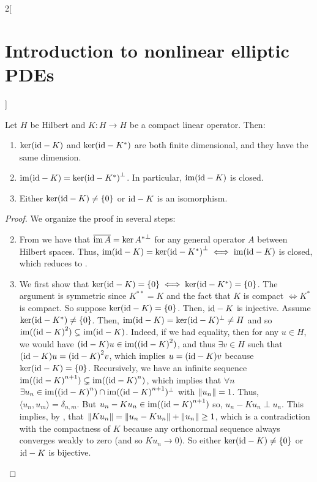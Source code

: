 \documentclass[../../../main_math.tex]{subfiles}
\begin{document}
\begin{multicols}{2}[\section{Introduction to nonlinear elliptic PDEs}]
\begin{theorem}
    Let $H$ be Hilbert and $K:H\to H$ be a compact linear operator. Then:
    \begin{enumerate}
      \item $\ker(\mathrm{id}-K)$ and $\ker(\mathrm{id}-K^*)$ are both finite dimensional, and they have the same dimension.
      \item $\operatorname{im}(\mathrm{id}-K)={\ker(\mathrm{id}-K^*)}^\perp$. In particular, $\operatorname{im}(\mathrm{id}-K)$ is closed.
      \item Either $\ker(\mathrm{id}-K)\ne\{0\}$ or $\mathrm{id} -K$ is an isomorphism.
    \end{enumerate}
  \end{theorem}
  \begin{proof}
    We organize the proof in several steps:
    \begin{enumerate}
      \setcounter{enumi}{1}
      \item From  we have that $\overline{\operatorname{im} A}={\ker A^*}^\perp$ for any general operator $A$ between Hilbert spaces. Thus, $\operatorname{im}(\mathrm{id}-K)={\ker(\mathrm{id}-K^*)}^\perp\iff \operatorname{im}(\mathrm{id}-K)$ is closed, which reduces to .
      \item We first show that $\ker(\mathrm{id}-K)=\{0\}\iff \ker(\mathrm{id}-K^*)=\{0\}$. The argument is symmetric since $K^{**}=K$ and the fact that $K$ is compact $\iff K^*$ is compact. So suppose $\ker(\mathrm{id}-K)=\{0\}$. Then, $\mathrm{id} -K$ is injective. Assume $\ker(\mathrm{id}-K^*)\ne\{0\}$. Then, $\operatorname{im} (\mathrm{id}-K)=\ker(\mathrm{id}-K)^\perp\ne H$ and so $\operatorname{im}({(\mathrm{id}-K)}^2)\subsetneq \operatorname{im}(\mathrm{id}-K)$. Indeed, if we had equality, then for any $u\in H$, we would have ${(\mathrm{id}-K)u}\in \operatorname{im}({(\mathrm{id}-K)}^2)$, and thus $\exists v\in H$ such that ${(\mathrm{id}-K)u}={(\mathrm{id}-K)}^2v$, which implies $u={(\mathrm{id}-K)}v$ because $\ker (\mathrm{id}-K)=\{0\}$. Recursively, we have an infinite sequence $\operatorname{im}({(\mathrm{id}-K)}^{n+1})\subsetneq \operatorname{im}({(\mathrm{id}-K)}^n)$, which implies that $\forall n$ $\exists u_n\in \operatorname{im}({(\mathrm{id}-K)}^n)\cap\operatorname{im}({(\mathrm{id}-K)}^{n+1})^\perp$ with $\left\|u_n\right\|=1$. Thus, $\langle u_n,u_m\rangle=\delta_{n,m}$. But $u_n-Ku_n\in \operatorname{im}({(\mathrm{id}-K)}^{n+1})$ so, $u_n-Ku_n\perp u_n$. This implies, by , that $\left\|Ku_n\right\|=\left\|u_n-Ku_n\right\|+\left\|u_n\right\|\geq 1$, which is a contradiction with the compactness of $K$ because any orthonormal sequence always converges weakly to zero (and so $Ku_n\to 0$). So either $\ker(\mathrm{id}-K)\ne\{0\}$ or $\mathrm{id}-K$ is bijective.


\end{enumerate}
\end{proof}
\end{multicols}
\end{document}
